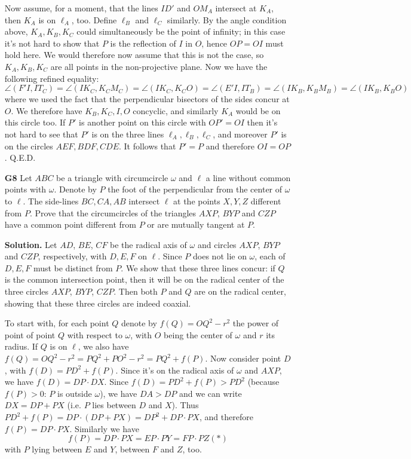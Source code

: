 \documentclass[11pt,a4paper]{article}
\begin{document}
\begin{enumerate}
	Now assume, for a moment, that the lines $ID'$ and $OM_A$ intersect at $K_A$, then $K_A$ is on $\ell_A$, too. Define $\ell_B$ and $\ell_C$ similarly. By the angle condition above, $K_A, K_B, K_C$ could simultaneously be the point of infinity; in this case it's not hard to show that $P$ is the reflection of $I$ in $O$, hence $OP=OI$ must hold here. We would therefore now assume that this is not the case, so $K_A, K_B, K_C$ are all points in the non-projective plane. 
	Now we have the following refined equality: 
	\[
	\angle(F'I, IT_C)=\angle(IK_C, K_CM_C) = \angle(IK_C, K_CO) = \angle(E'I, IT_B)=\angle(IK_B, K_BM_B)=\angle (IK_B, K_BO)
	\]
	where we used the fact that the perpendicular bisectors of the sides concur at $O$. 
	We therefore have $K_B, K_C, I, O$ concyclic, and similarly $K_A$ would be on this circle too. 
	If $P'$ is another point on this circle with $OP'=OI$ then it's not hard to see that $P'$ is on the three lines $\ell_A, \ell_B, \ell_C$, and moreover $P'$ is on the circles $AEF, BDF, CDE$. It follows that $P'=P$ and therefore $OI=OP$. Q.E.D. 
	
	\item[\textbf{G8}] Let $ABC$ be a triangle with circumcircle $\omega$ and $\ell$ a line without common points with $\omega$. Denote by $P$ the foot of the perpendicular from the center of $\omega$ to $\ell$. The side-lines $BC,CA,AB$ intersect $\ell$ at the points $X,Y,Z$ different from $P$. Prove that the circumcircles of the triangles $AXP$, $BYP$ and $CZP$ have a common point different from $P$ or are mutually tangent at $P$.
	
	\textbf{Solution.} Let $AD$, $BE$, $CF$ be the radical axis of $\omega$ and circles $AXP$, $BYP$ and $CZP$, respectively, with $D, E, F$ on $\ell$. Since $P$ does not lie on $\omega$, each of $D, E, F$ must be distinct from $P$. We show that these three lines concur: if $Q$ is the common intersection point, then it will be on the radical center of the three circles $AXP$, $BYP$, $CZP$. Then both $P$ and $Q$ are on the radical center, showing that these three circles are indeed coaxial. 
	
	To start with, for each point $Q$ denote by $f(Q)=OQ^2-r^2$ the power of point of point $Q$ with respect to $\omega$, with $O$ being the center of $\omega$ and $r$ its radius. If $Q$ is on $\ell$, we also have $f(Q)=OQ^2-r^2=PQ^2+PO^2-r^2=PQ^2+f(P)$. 
	Now consider point $D$, with $f(D)=PD^2+f(P)$. Since it's on the radical axis of $\omega$ and $AXP$, we have $f(D)=DP\cdot DX$. Since $f(D)=PD^2+f(P)>PD^2$ (because $f(P)>0$: $P$ is outside $\omega$), we have $DA>DP$ and we can write $DX=DP+PX$ (i.e. $P$ lies between $D$ and $X$). 
	Thus $PD^2+f(P)=DP\cdot (DP+PX)=DP^2+DP\cdot PX$, and therefore $f(P)=DP\cdot PX$. Similarly we have 
	\[
	f(P)=DP\cdot PX=EP\cdot PY=FP\cdot PZ (*)
	\]
	with $P$ lying between $E$ and $Y$, between $F$ and $Z$, too. 
	

\end{enumerate}
\end{document}

